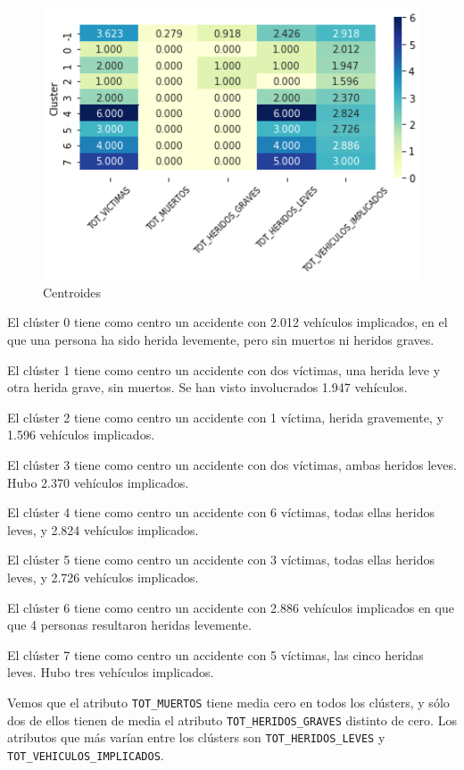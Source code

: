\documentclass[a4]{article}
\begin{document}
\begin{figure}[H]
  \centering
  \caption{Centroides}
  \includegraphics[width=130mm]{imagenes/c2_dbscan_centroides}
\end{figure}

El clúster 0 tiene como centro un accidente con 2.012 vehículos implicados, en el que una persona ha sido herida levemente, pero sin muertos ni heridos graves.

El clúster 1 tiene como centro un accidente con dos víctimas, una herida leve y otra herida grave, sin muertos. Se han visto involucrados 1.947 vehículos.

El clúster 2 tiene como centro un accidente con 1 víctima, herida gravemente, y 1.596 vehículos implicados.

El clúster 3 tiene como centro un accidente con dos víctimas, ambas heridos leves. Hubo 2.370 vehículos implicados.

El clúster 4 tiene como centro un accidente con 6 víctimas, todas ellas heridos leves, y 2.824 vehículos implicados.

El clúster 5 tiene como centro un accidente con 3 víctimas, todas ellas heridos leves, y 2.726 vehículos implicados.

El clúster 6 tiene como centro un accidente con 2.886 vehículos implicados en que que 4 personas resultaron heridas levemente.

El clúster 7 tiene como centro un accidente con 5 víctimas, las cinco heridas leves. Hubo tres vehículos implicados.

Vemos que el atributo \texttt{TOT\_MUERTOS} tiene media cero en todos los clústers, y sólo dos de ellos tienen de media el atributo \texttt{TOT\_HERIDOS\_GRAVES} distinto de cero. Los atributos que más varían entre los clústers son \texttt{TOT\_HERIDOS\_LEVES} y \texttt{TOT\_VEHICULOS\_IMPLICADOS}.
\end{document}
